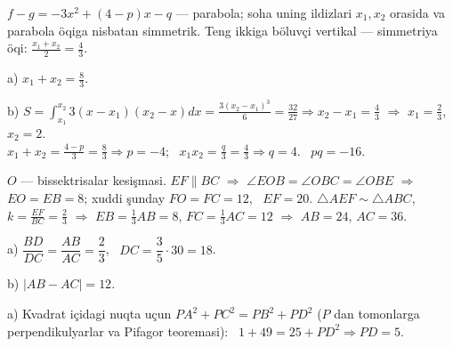 \newpage
{}
$f-g=-3x^2+(4-p)x-q$ — parabola; soha uning ildizlari $x_1,x_2$ orasida va parabola öqiga nisbatan simmetrik. Teng ikkiga böluvçi vertikal — simmetriya öqi: $\frac{x_1+x_2}2=\frac43$.

a) $x_1+x_2=\frac83$.

b) $S=\displaystyle\int_{x_1}^{x_2}3(x-x_1)(x_2-x)dx=\frac{3(x_2-x_1)^3}6=\frac{32}{27}\Rightarrow x_2-x_1=\frac43$ $\Rightarrow$ $x_1=\frac23$, $x_2=2$.\\
$x_1+x_2=\frac{4-p}3=\frac83\Rightarrow p=-4$; \ $x_1x_2=\frac q3=\frac43\Rightarrow q=4$. \ $pq=-16$.

\newpage
{}
$O$ — bissektrisalar kesişmasi. $EF\parallel BC$ $\Rightarrow$ $\angle EOB=\angle OBC=\angle OBE$ $\Rightarrow$ $EO=EB=8$; xuddi şunday $FO=FC=12$, \ $EF=20$.
$\triangle AEF\sim\triangle ABC$, \ $k=\frac{EF}{BC}=\frac23$ $\Rightarrow$ $EB=\frac13AB=8$, $FC=\frac13AC=12$ $\Rightarrow$ $AB=24$, $AC=36$.

a) $\dfrac{BD}{DC}=\dfrac{AB}{AC}=\dfrac23$, \ $DC=\dfrac35\cdot30=18$.

b) $|AB-AC|=12$.

\newpage
{}
a) Kvadrat içidagi nuqta uçun $PA^2+PC^2=PB^2+PD^2$ ($P$ dan tomonlarga perpendikulyarlar va Pifagor teoremasi): \ $1+49=25+PD^2\Rightarrow PD=5$.

